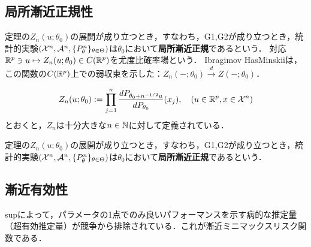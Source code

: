\documentclass[uplatex,dvipdfmx]{jsreport}
\begin{document}
\begin{lemma}
    
\end{lemma}

\subsection{局所漸近正規性}

\begin{tcolorbox}[colframe=ForestGreen, colback=ForestGreen!10!white,breakable,colbacktitle=ForestGreen!40!white,coltitle=black,fonttitle=\bfseries\sffamily,
title=]
    定理の$Z_n(u;\theta_0)$の展開が成り立つとき，すなわち，G1,G2が成り立つとき，統計的実験$(\mathcal{X}^n,\mathcal{A}^n,\{P^n_\theta\}_{\theta\in\Theta})$は$\theta_0$において\textbf{局所漸近正規}であるという．
    対応$\mathbb{R}^p\ni u\mapsto Z_n(u;\theta_0)\in C(\mathbb{R}^p)$を尤度比確率場という．
    Ibragimov HasMinskiiは，この関数の$C(\mathbb{R}^p)$上での弱収束を示した：$Z_n(-;\theta_0)\xrightarrow{d}Z(-;\theta_0)$．
\end{tcolorbox}

\begin{notation}
    \[Z_n(u;\theta_0):=\prod^n_{j=1}\frac{dP_{\theta_0+n^{-1/2}u}}{dP_{\theta_0}}(x_j),\quad(u\in\mathbb{R}^p,x\in\mathcal{X}^n)\]
    とおくと，$Z_n$は十分大きな$n\in\mathbb{N}$に対して定義されている．
\end{notation}

\begin{theorem}
    
\end{theorem}

\begin{definition}
    定理の$Z_n(u;\theta_0)$の展開が成り立つとき，すなわち，G1,G2が成り立つとき，統計的実験$(\mathcal{X}^n,\mathcal{A}^n,\{P^n_\theta\}_{\theta\in\Theta})$は$\theta_0$において\textbf{局所漸近正規}であるという．
\end{definition}

\subsection{漸近有効性}

\begin{tcolorbox}[colframe=ForestGreen, colback=ForestGreen!10!white,breakable,colbacktitle=ForestGreen!40!white,coltitle=black,fonttitle=\bfseries\sffamily,
title=]
    supによって，パラメータの1点でのみ良いパフォーマンスを示す病的な推定量（超有効推定量）が競争から排除されている．これが漸近ミニマックスリスク関数である．
\end{tcolorbox}
\end{document}
